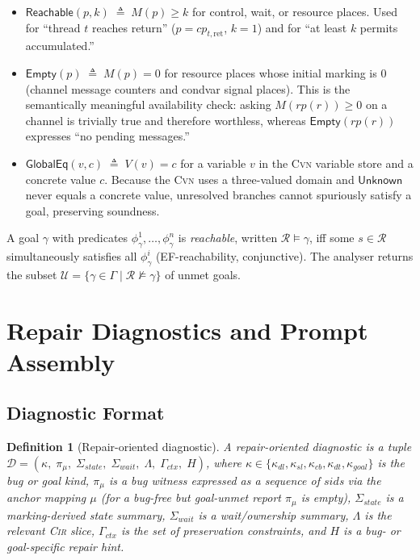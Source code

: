 \documentclass{article}
\newtheorem{definition}{Definition}
\begin{document}
\begin{itemize}[leftmargin=1.5em]
  \item $\mathsf{Reachable}(p,k)\;\triangleq\;M(p)\ge k$ for
    control, wait, or resource places.  Used for ``thread $t$ reaches
    return'' ($p=cp_{t,\mathrm{ret}}$, $k=1$) and for ``at least $k$
    permits accumulated.''

  \item $\mathsf{Empty}(p)\;\triangleq\;M(p)=0$ for resource places
    whose initial marking is $0$ (channel message counters and condvar
    signal places).  This is the semantically meaningful availability
    check: asking $M(rp(r))\ge 0$ on a channel is trivially true and
    therefore worthless, whereas $\mathsf{Empty}(rp(r))$ expresses
    ``no pending messages.''

  \item $\mathsf{GlobalEq}(v,c)\;\triangleq\; V(v)=c$ for a variable
    $v$ in the \textsc{Cvn} variable store and a concrete value $c$.
    Because the \textsc{Cvn} uses a three-valued domain and
    $\mathsf{Unknown}$ never equals a concrete value, unresolved
    branches cannot spuriously satisfy a goal, preserving soundness.
\end{itemize}

A goal $\gamma$ with predicates
$\phi_{\gamma}^{1},\dots,\phi_{\gamma}^{n}$ is \emph{reachable},
written $\mathcal{R}\models\gamma$, iff some $s\in\mathcal{R}$
simultaneously satisfies all $\phi_{\gamma}^{i}$ (EF-reachability,
conjunctive).  The analyser returns the subset
$\mathcal{U}=\{\gamma\in\Gamma\mid\mathcal{R}\not\models\gamma\}$ of
unmet goals.

\section{Repair Diagnostics and Prompt Assembly}
\label{app:repair-details}

\subsection{Diagnostic Format}

\begin{definition}[Repair-oriented diagnostic]
\label{def:diagnostic}
A repair-oriented diagnostic is a tuple $\mathcal{D}=(\kappa,\;\pi_{\mu},\;\Sigma_{\mathit{state}},\;\Sigma_{\mathit{wait}},\;\Lambda,\;\Gamma_{\mathit{ctx}},\;H)$, where
$\kappa\in\{\kappa_{dl},\kappa_{sl},\kappa_{cb},\kappa_{dt}, \kappa_{goal}\}$ is the bug or goal kind, $\pi_{\mu}$ is a bug witness expressed as a sequence of
$\mathit{sid}$s via the anchor mapping $\mu$ (for a bug-free but goal-unmet report $\pi_{\mu}$ is empty), $\Sigma_{\mathit{state}}$ is a marking-derived state summary, $\Sigma_{\mathit{wait}}$ is a wait/ownership summary, $\Lambda$ is the relevant \textsc{Cir} slice, $\Gamma_{\mathit{ctx}}$ is the set of preservation constraints, and $H$ is a bug- or goal-specific repair hint.
\end{definition}
\end{document}
